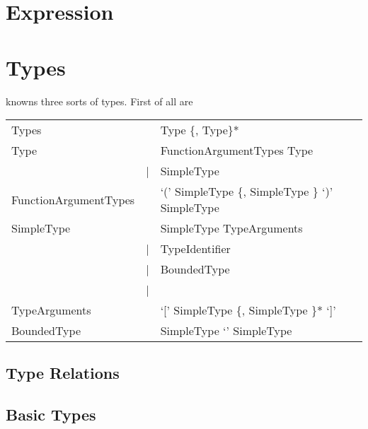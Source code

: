 \chapter{Expression}

\chapter{Types}
\ooplss knowns three sorts of types. First of all are

\begin{listing}
	\begin{tabular}[H]{lrl}
		Types & \lra & Type \{, Type\}* \\
		Type & \lra & FunctionArgumentTypes \ra Type\\
				& | & SimpleType \\
		FunctionArgumentTypes & \lra & `(' SimpleType \{, SimpleType \} `)' \ra SimpleType \\
		SimpleType & \lra & SimpleType TypeArguments \\
								& | & TypeIdentifier \\
								& | & BoundedType \\
								& | & \mytype \\
		TypeArguments &\lra & `[' SimpleType \{, SimpleType \}* `]' \\
		BoundedType & \lra & SimpleType `\match' SimpleType \\
	\end{tabular}
\end{listing}

\section{Type Relations}
\section{Basic Types}

